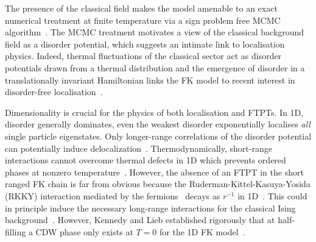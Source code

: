 The presence of the classical field makes the model amenable to an exact numerical treatment at finite temperature via a sign problem free \ac{MCMC} algorithm~\cite{devriesGapsDensitiesStates1993,devriesSimplifiedHubbardModel1993,antipovInteractionTunedAndersonMott2016,debskiPossibilityDetectionFinite2016,herrmannSpreadingCorrelationsFalicovKimball2018,maskaThermodynamicsTwodimensionalFalicovKimball2006}. The \ac{MCMC} treatment motivates a view of the classical background field as a disorder potential, which suggests an intimate link to localisation physics. Indeed, thermal fluctuations of the classical sector act as disorder potentials drawn from a thermal distribution and the emergence of disorder in a translationally invariant Hamiltonian links the \ac{FK} model to recent interest in disorder-free localisation~\cite{smithDisorderFreeLocalization2017,smithDynamicalLocalizationMathbbZ2018,brenesManyBodyLocalizationDynamics2018}.

Dimensionality is crucial for the physics of both localisation and \acp{FTPT}. In 1D, disorder generally dominates, even the weakest disorder exponentially localises \textit{all} single particle eigenstates. Only longer-range correlations of the disorder potential can potentially induce delocalization~\cite{aubryAnalyticityBreakingAnderson1980,dassarmaLocalizationMobilityEdges1990,dunlapAbsenceLocalizationRandomdimer1990}. Thermodynamically, short-range interactions cannot overcome thermal defects in 1D which prevents ordered phases at nonzero temperature~\cite{andersonAbsenceDiffusionCertain1958,goldshteinPurePointSpectrum1977a,abrahamsScalingTheoryLocalization1979,kramerLocalizationTheoryExperiment1993}. However, the absence of an \ac{FTPT} in the short ranged \ac{FK} chain is far from obvious because the Ruderman-Kittel-Kasuya-Yosida (RKKY) interaction mediated by the fermions~\cite{kasuyaTheoryMetallicFerro1956,rudermanIndirectExchangeCoupling1954,vanvleckNoteInteractionsSpins1962,yosidaMagneticPropertiesCuMn1957} decays as \(r^{-1}\) in 1D~\cite{rusinCalculationRKKYRange2017a}. This could in principle induce the necessary long-range interactions for the classical Ising background~\cite{thoulessLongRangeOrderOneDimensional1969,peierlsIsingModelFerromagnetism1936}. However, Kennedy and Lieb established rigorously that at half-filling a \ac{CDW} phase only exists at \(T = 0\) for the 1D \ac{FK} model~\cite{kennedyItinerantElectronModel1986}. 

